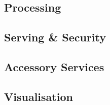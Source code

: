 \subsection{Processing}



\subsection{Serving \& Security}



\subsection{Accessory Services}



\subsection{Visualisation}

